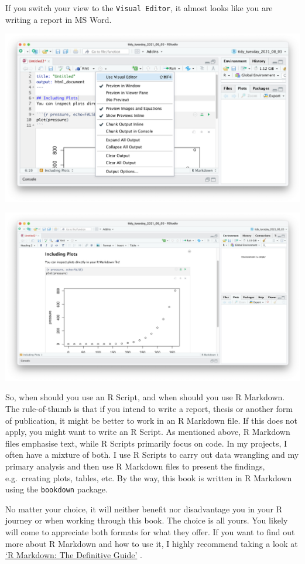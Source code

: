 \documentclass[
]{book}
\begin{document}
If you switch your view to the \texttt{Visual\ Editor}, it almost looks like you are writing a report in MS Word.

\includegraphics{images/chapter_06_img/03_r_markdown/02_r_markdown_visual_editor_menu.png}

\includegraphics{images/chapter_06_img/03_r_markdown/03_r_markdown_visual_editor.png}

So, when should you use an R Script, and when should you use R Markdown. The rule-of-thumb is that if you intend to write a report, thesis or another form of publication, it might be better to work in an R Markdown file. If this does not apply, you might want to write an R Script. As mentioned above, R Markdown files emphasise text, while R Scripts primarily focus on code. In my projects, I often have a mixture of both. I use R Scripts to carry out data wrangling and my primary analysis and then use R Markdown files to present the findings, e.g.~creating plots, tables, etc. By the way, this book is written in R Markdown using the \texttt{bookdown} package.

No matter your choice, it will neither benefit nor disadvantage you in your R journey or when working through this book. The choice is all yours. You likely will come to appreciate both formats for what they offer. If you want to find out more about R Markdown and how to use it, I highly recommend taking a look at \href{https://bookdown.org/yihui/rmarkdown/}{`R Markdown: The Definitive Guide'} \citep{rmarkdown2018}.
\end{document}
